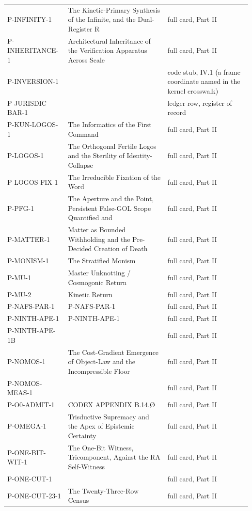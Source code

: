 \documentclass[10pt,twocolumn]{article}
\begin{document}
\begin{center}
\begin{longtable}{>{\raggedright\arraybackslash}p{}>{\raggedright\arraybackslash}p{}>{\raggedright\arraybackslash}p{}}
P-INFINITY-1 & The Kinetic-Primary Synthesis of the Infinite, and the Dual-Register R & full card, Part II \\
P-INHERITANCE-1 & Architectural Inheritance of the Verification Apparatus Across Scale & full card, Part II \\
P-INVERSION-1 &  & code stub, IV.1 (a frame coordinate named in the kernel crosswalk) \\
P-JURISDIC-BAR-1 &  & ledger row, register of record \\
P-KUN-LOGOS-1 & The Informatics of the First Command & full card, Part II \\
P-LOGOS-1 & The Orthogonal Fertile Logos and the Sterility of Identity-Collapse & full card, Part II \\
P-LOGOS-FIX-1 & The Irreducible Fixation of the Word & full card, Part II \\
P-PFG-1 & The Aperture and the Point, Persistent False-GOL Scope Quantified and & full card, Part II \\
P-MATTER-1 & Matter as Bounded Withholding and the Pre-Decided Creation of Death & full card, Part II \\
P-MONISM-1 & The Stratified Monism & full card, Part II \\
P-MU-1 & Master Unknotting / Cosmogonic Return & full card, Part II \\
P-MU-2 & Kinetic Return & full card, Part II \\
P-NAFS-PAR-1 & [codex home: §IV/§XVIII] P-NAFS-PAR-1 & full card, Part II \\
P-NINTH-APE-1 & [codex home: §IV/§XVIII] P-NINTH-APE-1 & full card, Part II \\
P-NINTH-APE-1B &  & full card, Part II \\
P-NOMOS-1 & The Cost-Gradient Emergence of Object-Law and the Incompressible Floor & full card, Part II \\
P-NOMOS-MEAS-1 &  & full card, Part II \\
P-O0-ADMIT-1 & CODEX APPENDIX B.14.Ø & full card, Part II \\
P-OMEGA-1 & Trisductive Supremacy and the Apex of Epistemic Certainty & full card, Part II \\
P-ONE-BIT-WIT-1 & The One-Bit Witness, Tricomponent, Against the RA Self-Witness & full card, Part II \\
P-ONE-CUT-1 &  & full card, Part II \\
P-ONE-CUT-23-1 & The Twenty-Three-Row Census & full card, Part II \\

\end{longtable}
\end{center}
\end{document}
